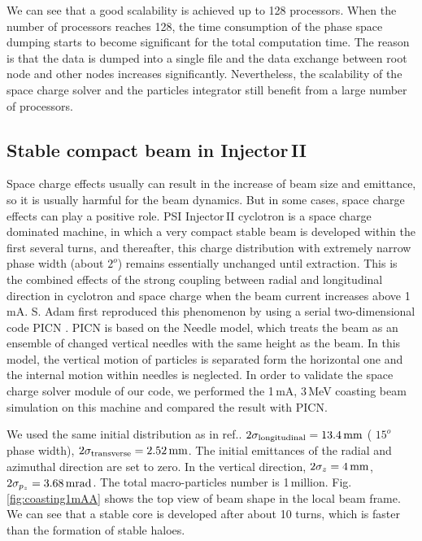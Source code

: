 \documentclass[aps,prstab,twocolumn,superscriptaddress]{revtex4}
\begin{document}
We can see that a good scalability is achieved up to 128 processors. When the number of processors reaches 128, the time consumption of the phase space dumping starts to become significant for the total computation time.
The reason is that the data is dumped into a single file and the data exchange between root node and other nodes increases significantly.
Nevertheless, the scalability of the space charge solver and the particles integrator still benefit from a large number of processors.
\subsection{Stable compact beam in Injector\,II}
Space charge effects usually can result in the increase of beam size and emittance, so it is usually harmful for the beam dynamics. 
But in some cases, space charge effects can play a positive role. PSI Injector\,II cyclotron is a space charge dominated machine, in which a very compact 
stable beam is developed within the first several turns, and thereafter, this charge distribution with extremely narrow phase width (about $2^o$) 
remains essentially unchanged until extraction. This is the combined effects of the strong coupling between 
radial and longitudinal direction in cyclotron and space charge when the beam current increases above 1\,mA. S. Adam first reproduced this phenomenon by 
using a serial two-dimensional code PICN \cite{Adam:1}. PICN is based on the Needle model, which treats the beam as 
an ensemble of changed vertical needles with the same height as the beam. In this model, the vertical motion of particles is separated form the horizontal 
one and the internal motion within needles is neglected. In order to validate the space charge solver module of our code, we performed the 1\,mA, 3\,MeV coasting beam simulation on this machine and compared the result with PICN.  

We used the same initial distribution as in ref.\cite{Adam:3}.
$2\sigma_{\RM{longitudinal}} = 13.4 {\RM{\,mm}}$ ( $15^o$ phase width), $2\sigma_{\RM{transverse}} = 2.52 {\RM{\,mm}}$. 
The initial emittances of the radial and azimuthal direction are set to zero. 
In the vertical direction, $2\sigma_z = 4{\RM{\,mm}}$, $2\sigma_{p_z} = 3.68{\RM{\,mrad}}$. 
The total macro-particles number is 1\,million.  Fig.\,\ref{fig:coasting1mAA} shows the top view of beam shape in the local beam frame.
We can see that a stable core is developed after about 10 turns, which is faster than the formation of stable haloes.
\end{document}
